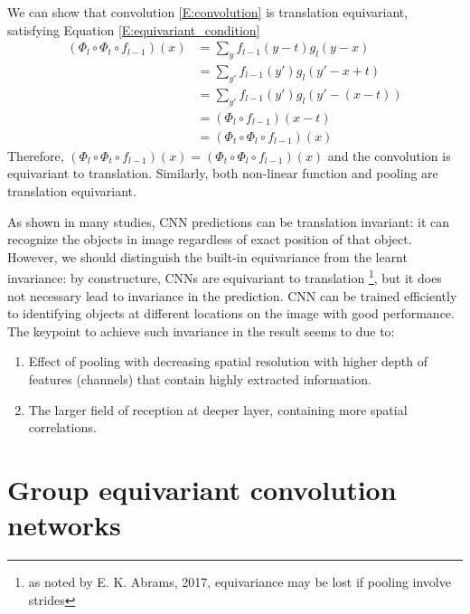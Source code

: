 \documentclass{IEEEtran}
\begin{document}
We can show that convolution \eqref{E:convolution} is translation equivariant, satisfying Equation \eqref{E:equivariant_condition}
\begin{align*}
    (\Phi_l \circ \Phi_t \circ f_{l-1}) (x) &= \sum_y f_{l-1}(y-t) g_l(y-x) \\
    &= \sum_{y'} f_{l-1}(y') g_l(y'-x+t) \\
    &= \sum_{y'} f_{l-1}(y') g_l(y'-(x-t)) \\
    &= (\Phi_l \circ f_{l-1}) (x-t) \\ &= (\Phi_t \circ \Phi_l \circ f_{l-1}) (x)
\end{align*}
Therefore, $(\Phi_l \circ \Phi_t \circ f_{l-1}) (x) = (\Phi_t \circ \Phi_l \circ f_{l-1}) (x)$ and the convolution
is equivariant to translation. Similarly, both non-linear function and pooling are translation equivariant.

\vspace{10pt}
As shown in many studies, CNN predictions can be translation invariant: it can recognize the objects in 
image regardless of exact position of that object. However, we should distinguish the built-in equivariance 
from the learnt invariance\cite{kauderer-abrams_quantifying_2017}: 
by constructure, CNNs are equivariant to translation \footnote{as noted by E. K. Abrams, 2017, equivariance may be lost if pooling involve strides}, 
but it does not necessary lead to invariance in the prediction. 
CNN can be trained efficiently to identifying objects at different locations on the image with good performance.
The keypoint to achieve such invariance in the result seems to due to:
\begin{enumerate}
    \item Effect of pooling with decreasing spatial resolution with higher depth of features (channels) that contain highly extracted information.
    \item The larger field of reception at deeper layer, containing more spatial correlations. 
\end{enumerate}

\section{Group equivariant convolution networks}
\end{document}
